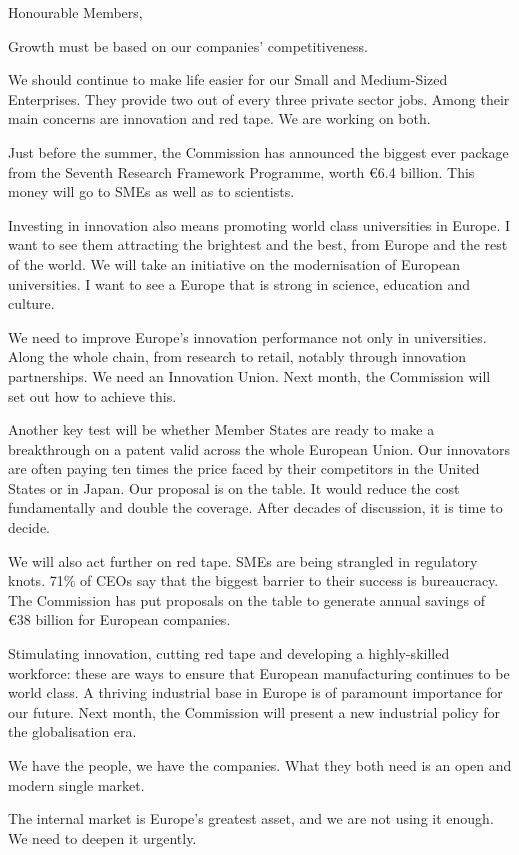 \documentclass[a4paper,11pt]{article}
\begin{document}
Honourable Members,

Growth must be based on our companies' competitiveness.

We should continue to make life easier for our Small and Medium-Sized Enterprises. They provide two out of every three private sector jobs. Among their main concerns are innovation and red tape. We are working on both.

Just before the summer, the Commission has announced the biggest ever package from the Seventh Research Framework Programme, worth \euro6.4 billion. This money will go to SMEs as well as to scientists.

Investing in innovation also means promoting world class universities in Europe. I want to see them attracting the brightest and the best, from Europe and the rest of the world. We will take an initiative on the modernisation of European universities. I want to see a Europe that is strong in science, education and culture.

We need to improve Europe's innovation performance not only in universities. Along the whole chain, from research to retail, notably through innovation partnerships. We need an Innovation Union. Next month, the Commission will set out how to achieve this.

Another key test will be whether Member States are ready to make a breakthrough on a patent valid across the whole European Union. Our innovators are often paying ten times the price faced by their competitors in the United States or in Japan. Our proposal is on the table. It would reduce the cost fundamentally and double the coverage. After decades of discussion, it is time to decide.

We will also act further on red tape. SMEs are being strangled in regulatory knots. 71\% of CEOs say that the biggest barrier to their success is bureaucracy. The Commission has put proposals on the table to generate annual savings of \euro38 billion for European companies.

Stimulating innovation, cutting red tape and developing a highly-skilled workforce: these are ways to ensure that European manufacturing continues to be world class. A thriving industrial base in Europe is of paramount importance for our future. Next month, the Commission will present a new industrial policy for the globalisation era.

We have the people, we have the companies. What they both need is an open and modern single market.

The internal market is Europe's greatest asset, and we are not using it enough. We need to deepen it urgently.
\end{document}
